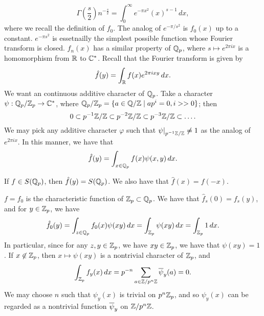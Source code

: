 \[ \Gamma\left(\frac{s}{2}\right) n^{-\frac{s}{2}} = \int_0^\infty e^{-\pi x^2} (x)^{s-1} \, dx, \]
where we recall the definition of $f_0$. The analog of $e^{-\pi/s^2}$ is $f_0(x)$ up to a constant. $e^{-\pi s^2}$ is essetnailly the simplest possible function whose Fourier transform is closed. $f_n(x)$ has a similar property of $\mathbb Q_p$, where $s \mapsto e^{2\pi i x}$ is a homomorphism from $\mathbb R$ to $\mathbb C^\ast$. Recall that the Fourier transform is given by
\[ \hat f(y) = \int_\mathbb R f(x) e^{2\pi i x y} \, dx. \]
We want an continuous additive character of $\mathbb Q_p$. Take a character $\psi : \mathbb Q_p/\mathbb Z_p \to \mathbb C^\ast$, where $\mathbb Q_p/\mathbb Z_p = \{a \in \mathbb Q/\mathbb Z \mid ap^i = 0, i >> 0\}$; then
\[ 0 \subset p^{-1} \mathbb Z/\mathbb Z \subset p^{-2} \mathbb Z/\mathbb Z \subset p^{-3} \mathbb Z/\mathbb Z \subset \dots. \]
We may pick any additive character $\varphi$ such that $\restr{\psi}{p\inv \ZZ/\ZZ} \neq 1$ as the analog of $e^{2\pi i x}$. In this manner, we have that
\[ \hat f(y) = \int_{x \in \mathbb Q_p} f(x) \psi(x, y) \, dx. \] \vspace{-16pt}
\begin{lemma}
    If $f \in S(\mathbb Q_p)$, then $\hat f(y) = S(\mathbb Q_p)$. We also have that $\hat f(x) = f(-x)$.
\end{lemma}
\noindent $f = f_0$ is the characteristic function of $\mathbb Z_p \subset \mathbb Q_p$. We have that $\hat f_s(0) = f_s(y)$, and for $y \in \mathbb Z_p$, we have
\[ \hat f_0(y) = \int_{z \in \mathbb Q_p} f_0(x) \psi(xy) \, dx = \int_{\mathbb Z_p} \psi(xy) \, dx = \int_{\mathbb Z_p} 1 \, dx. \]
In particular, since for any $z, y \in \mathbb Z_p$, we have $xy \in \mathbb Z_p$, we have that $\psi(xy) = 1$. If $x \not\in \mathbb Z_p$, then $x \mapsto \psi(xy)$ is a nontrivial character of $\mathbb Z_p$, and
\[ \int_{\mathbb Z_p} f_y(x) \, dx = p^{-n} \sum_{a \in \mathbb Z/p^n \mathbb Z} \overline \psi_y(a) = 0. \]
We may choose $n$ such that $\psi_y(x)$ is trivial on $p^n \mathbb Z_p$, and so $\psi_y(x)$ can be regarded as a nontrivial function $\overline \psi_y$ on $\mathbb Z/p^n \mathbb Z$.